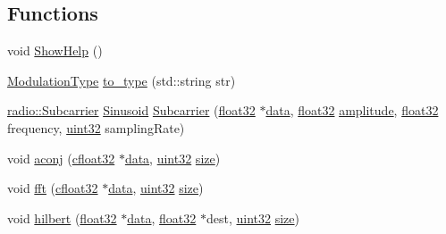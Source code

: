 \subsection*{Functions}
\begin{DoxyCompactItemize}
\item 
void \hyperlink{namespaceradio_a6db7c682d0f9aeac8cb5042717b8ae7f}{Show\+Help} ()
\item 
\hyperlink{namespaceradio_a46fb7299001138f28b7f69975c58399e}{Modulation\+Type} \hyperlink{namespaceradio_a402fe28e2e2bb2be7a0d2d9f74cc640d}{to\+\_\+type} (std\+::string str)
\item 
\hyperlink{classradio_1_1Subcarrier}{radio\+::\+Subcarrier} \hyperlink{classradio_1_1Sinusoid}{Sinusoid} \hyperlink{namespaceradio_ab6cdb3a30b3a9dda10023da190028d8a}{Subcarrier} (\hyperlink{definitions_8hpp_aacdc525d6f7bddb3ae95d5c311bd06a1}{float32} $\ast$\hyperlink{Subcarrier_8hpp_a7e2e55177abd6522b546b51f851e8f22}{data}, \hyperlink{definitions_8hpp_aacdc525d6f7bddb3ae95d5c311bd06a1}{float32} \hyperlink{Subcarrier_8hpp_a5e811fba6f7ada5fe11de28ffd8f2f87}{amplitude}, \hyperlink{definitions_8hpp_aacdc525d6f7bddb3ae95d5c311bd06a1}{float32} frequency, \hyperlink{definitions_8hpp_a1134b580f8da4de94ca6b1de4d37975e}{uint32} sampling\+Rate)
\item 
void \hyperlink{namespaceradio_aa04bb922c40cafb00a5603f1fc6d9c26}{aconj} (\hyperlink{definitions_8hpp_a960be6b6614c08090c16574dba10a421}{cfloat32} $\ast$\hyperlink{Subcarrier_8hpp_a7e2e55177abd6522b546b51f851e8f22}{data}, \hyperlink{definitions_8hpp_a1134b580f8da4de94ca6b1de4d37975e}{uint32} \hyperlink{Subcarrier_8hpp_a0d40f1591c12f359c3fa3f982f9a221d}{size})
\item 
void \hyperlink{namespaceradio_ab146b5bf7f1c005939b024c9c4910a77}{fft} (\hyperlink{definitions_8hpp_a960be6b6614c08090c16574dba10a421}{cfloat32} $\ast$\hyperlink{Subcarrier_8hpp_a7e2e55177abd6522b546b51f851e8f22}{data}, \hyperlink{definitions_8hpp_a1134b580f8da4de94ca6b1de4d37975e}{uint32} \hyperlink{Subcarrier_8hpp_a0d40f1591c12f359c3fa3f982f9a221d}{size})
\item 
void \hyperlink{namespaceradio_a285a47b4ed81e5662d2b6b4bae0188d0}{hilbert} (\hyperlink{definitions_8hpp_aacdc525d6f7bddb3ae95d5c311bd06a1}{float32} $\ast$\hyperlink{Subcarrier_8hpp_a7e2e55177abd6522b546b51f851e8f22}{data}, \hyperlink{definitions_8hpp_aacdc525d6f7bddb3ae95d5c311bd06a1}{float32} $\ast$dest, \hyperlink{definitions_8hpp_a1134b580f8da4de94ca6b1de4d37975e}{uint32} \hyperlink{Subcarrier_8hpp_a0d40f1591c12f359c3fa3f982f9a221d}{size})
\item 

\end{DoxyCompactItemize}
